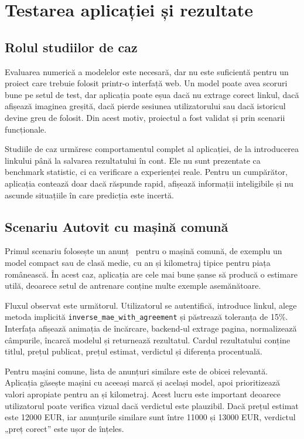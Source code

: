 \chapter{Testarea aplicației și rezultate}
\label{chapter:testing}

\section{Rolul studiilor de caz}
\label{sec:case-role}

Evaluarea numerică a modelelor este necesară, dar nu este suficientă pentru un proiect care trebuie folosit printr-o interfață web. Un model poate avea scoruri bune pe setul de test, dar aplicația poate eșua dacă nu extrage corect linkul, dacă afișează imaginea greșită, dacă pierde sesiunea utilizatorului sau dacă istoricul devine greu de folosit. Din acest motiv, proiectul a fost validat și prin scenarii funcționale.

Studiile de caz urmăresc comportamentul complet al aplicației, de la introducerea linkului până la salvarea rezultatului în cont. Ele nu sunt prezentate ca benchmark statistic, ci ca verificare a experienței reale. Pentru un cumpărător, aplicația contează doar dacă răspunde rapid, afișează informații inteligibile și nu ascunde situațiile în care predicția este incertă.

\section{Scenariu Autovit cu mașină comună}
\label{sec:case-autovit-common}

Primul scenariu folosește un anunț \autovit\ pentru o mașină comună, de exemplu un model compact sau de clasă medie, cu an și kilometraj tipice pentru piața românească. În acest caz, aplicația are cele mai bune șanse să producă o estimare utilă, deoarece setul de antrenare conține multe exemple asemănătoare.

Fluxul observat este următorul. Utilizatorul se autentifică, introduce linkul, alege metoda implicită \texttt{inverse\_mae\_with\_agreement} și păstrează toleranța de 15\%. Interfața afișează animația de încărcare, backend-ul extrage pagina, normalizează câmpurile, încarcă modelul și returnează rezultatul. Cardul rezultatului conține titlul, prețul publicat, prețul estimat, verdictul și diferența procentuală.

Pentru mașini comune, lista de anunțuri similare este de obicei relevantă. Aplicația găsește mașini cu aceeași marcă și același model, apoi prioritizează valori apropiate pentru an și kilometraj. Acest lucru este important deoarece utilizatorul poate verifica vizual dacă verdictul este plauzibil. Dacă prețul estimat este 12000 EUR, iar anunțurile similare sunt între 11000 și 13000 EUR, verdictul „preț corect” este ușor de înțeles.

